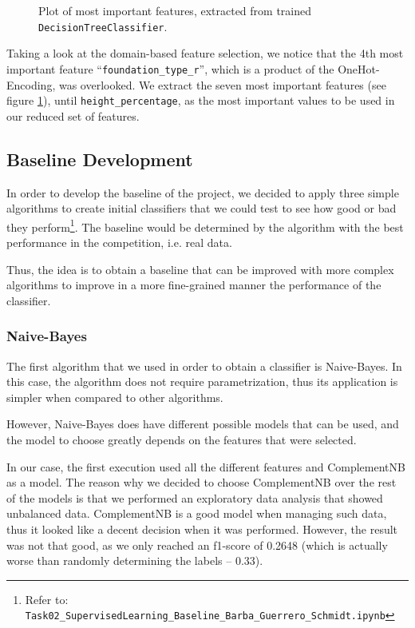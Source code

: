 \begin{figure}[h!]
	\centering
	\caption{Plot of most important features, extracted from trained \texttt{DecisionTreeClassifier}.}
	\label{PICTURE_featureimportances_dt}
\end{figure}

Taking a look at the domain-based feature selection, we notice that the 4th most important feature “\texttt{foundation\_type\_r}”, which is a product of the OneHot-Encoding, was overlooked. We extract the seven most important features (see figure \ref{PICTURE_featureimportances_dt}), until \texttt{height\_percentage}, as the most important values to be used in our reduced set of features.

\subsection{Baseline Development}
In order to develop the baseline of the project, we decided to apply three simple algorithms to create initial classifiers that we could test to see how good or bad they perform\footnote{Refer to: \texttt{Task02\_SupervisedLearning\_Baseline\_Barba\_Guerrero\_Schmidt.ipynb}}. The baseline would be determined by the algorithm with the best performance in the competition, i.e. real data.

Thus, the idea is to obtain a baseline that can be improved with more complex algorithms to improve in a more fine-grained manner the performance of the classifier.

\subsubsection{Naive-Bayes}
The first algorithm that we used in order to obtain a classifier is Naive-Bayes. In this case, the algorithm does not require parametrization, thus its application is simpler when compared to other algorithms.

However, Naive-Bayes does have different possible models that can be used, and the model to choose greatly depends on the features that were selected. 

In our case, the first execution used all the different features and ComplementNB as a model. The reason why we decided to choose ComplementNB over the rest of the models is that we performed an exploratory data analysis that showed unbalanced data. ComplementNB is a good model when managing such data, thus it looked like a decent decision when it was performed. However, the result was not that good, as we only reached an f1-score of 0.2648 (which is actually worse than randomly determining the labels – 0.33).

